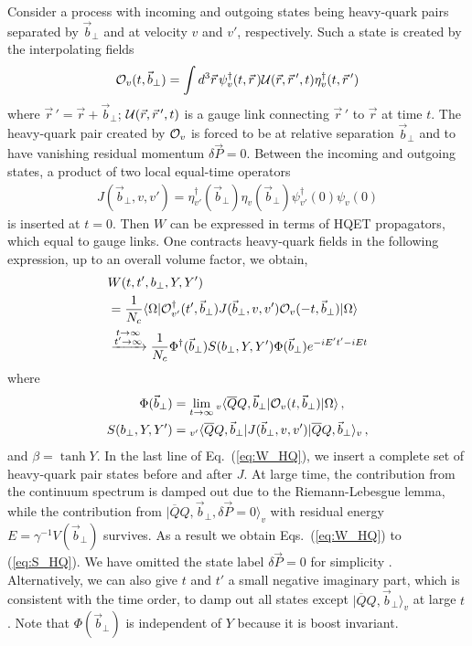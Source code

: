 \documentclass[twocolumn,aps,preprintnumbers,prd,superscriptaddress,10pt]{revtex4-1}
\begin{document}
Consider a process with incoming and outgoing states being heavy-quark pairs separated by ${\vec b}_\perp$ and at velocity $v$ and $v'$, respectively.
%
Such a state is created by the interpolating fields
\begin{align}
{\cal O}_v(t,{\vec b}_\perp)=\int d^3\vec r \, \psi_v^{\dagger}(t,\vec r\,) {\cal U}(\vec r,\vec r\,',t) \eta_v^{\dagger}(t,\vec r\,')
\end{align}
where $\vec r\,'=\vec r+\vec b_\perp$;
${\cal U}(\vec r,\vec r\,',t)$ is a gauge link connecting $\vec r\,'$ to $\vec r$ at time $t$.
%
The heavy-quark pair created by ${\cal O}_v$ is forced to be at relative separation $\vec{b}_\perp$ and to have vanishing residual momentum $\delta \vec P=0$.
%
Between the incoming and outgoing states, a product of two local equal-time operators
\begin{align}\label{eq:J}
J(\vec{b}_\perp,v,v')= \eta^\dagger_{v'}(\vec{b}_\perp)\eta_v(\vec{b}_\perp)\psi_{v'}^\dagger(0)\psi_v(0)
\end{align}
is inserted at $t=0$.
%
Then $W$ can be expressed in terms of HQET propagators, which equal to gauge links.
%
One contracts heavy-quark fields in the following expression, up to an overall volume factor, we obtain,
\begin{align}\label{eq:W_HQ}
&W(t,t',b_\perp,Y,Y') \nonumber\\
&=\frac{1}{N_c} \langle\Omega|{\cal O}^{\dagger}_{v'}(t',{\vec b}_\perp) J(\vec{b}_\perp,v,v') {\cal O}_v(-t,\vec{b}_\perp)|\Omega\rangle \nonumber\\
&\xrightarrow[]{\substack{t\to\infty\\t'\to\infty}} \frac{1}{N_c}\Phi^\dagger(\vec{b}_\perp) S(b_\perp,Y,Y') \Phi(\vec{b}_\perp)e^{-iE't'-iEt}
\end{align}
where
\begin{align}
\Phi(\vec{b}_\perp)&=\lim_{t\to\infty}{}_v\langle \overline QQ,\vec{b}_\perp|{\cal O}_v(t,\vec{b}_\perp)|\Omega\rangle\, ,\\
S(b_\perp,Y,Y')&={}_{v'}\langle\overline QQ,\vec{b}_\perp|J(\vec{b}_\perp,v,v')|\overline QQ,\vec{b}_\perp\rangle_v\, ,\label{eq:S_HQ}
\end{align}
and $\beta=\tanh Y$.
%
In the last line of Eq.~(\ref{eq:W_HQ}), we insert a complete set of heavy-quark pair states before and after $J$.
%
At large time, the contribution from the continuum spectrum is damped out due to the Riemann-Lebesgue lemma, while the contribution from $|\overline QQ,\vec{b}_\perp,\delta \vec{P}=0\rangle_v$ with residual energy $E=\gamma^{-1}V(\vec b_\perp)$ survives.
%
As a result we obtain Eqs.~(\ref{eq:W_HQ}) to (\ref{eq:S_HQ}).
%
We have omitted the state label $\delta \vec{P}=0$ for simplicity .
%
Alternatively, we can also give $t$ and $t'$ a small negative imaginary part, which is consistent with the time order, to damp out all states except $|\overline QQ,\vec{b}_\perp\rangle_v$ at large $t$.
%
Note that $\Phi(\vec{b}_\perp)$ is independent of $Y$ because it is boost invariant.
\end{document}
